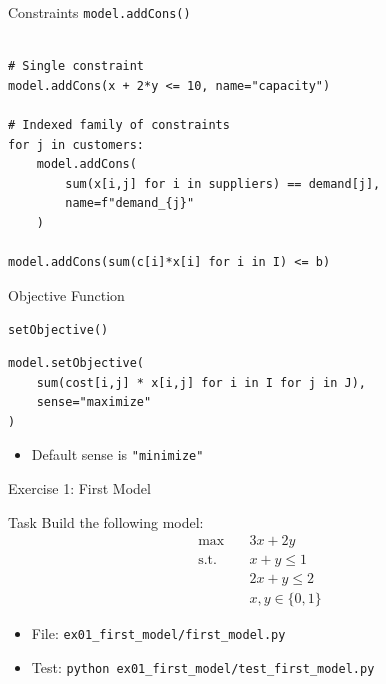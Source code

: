 \documentclass[aspectratio=169,10pt]{beamer}
\begin{document}
\begin{frame}[fragile]{Constraints}
\texttt{model.addCons()}

\begin{lstlisting}

# Single constraint
model.addCons(x + 2*y <= 10, name="capacity")

# Indexed family of constraints
for j in customers:
    model.addCons(
        sum(x[i,j] for i in suppliers) == demand[j],
        name=f"demand_{j}"
    )

model.addCons(sum(c[i]*x[i] for i in I) <= b)
\end{lstlisting}
\end{frame}

\begin{frame}[fragile]{Objective Function}

\texttt{setObjective()}
\begin{lstlisting}
model.setObjective(
    sum(cost[i,j] * x[i,j] for i in I for j in J),
    sense="maximize"
)
\end{lstlisting}

\medskip
\begin{itemize}
  \item Default sense is \texttt{"minimize"}
\end{itemize}
\end{frame}

\begin{frame}{Exercise 1: First Model}
\begin{block}{Task}
Build the following model:
\begin{align*}
  \max \quad & 3x + 2y \\
  \text{s.t.} \quad & x + y \le 1 \\
  & 2x + y \le 2 \\
  & x, y \in \{0, 1\}
\end{align*}
\end{block}
\begin{itemize}
  \item File: \texttt{ex01\_first\_model/first\_model.py}
  \item Test: \texttt{python ex01\_first\_model/test\_first\_model.py}
\end{itemize}
\end{frame}
\end{document}
